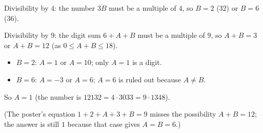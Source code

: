 Divisibility by $4$: the number $\overline{3B}$ must be a multiple of $4$, so $B=2$ ($32$) or $B=6$ ($36$).

Divisibility by $9$: the digit sum $6+A+B$ must be a multiple of $9$, so $A+B=3$ or $A+B=12$ (as $0\le A+B\le18$).
\begin{itemize}
\item $B=2$: $A=1$ or $A=10$; only $A=1$ is a digit.
\item $B=6$: $A=-3$ or $A=6$; $A=6$ is ruled out because $A\ne B$.
\end{itemize}
So $A=\boxed{1}$ (the number is $12132=4\cdot3033=9\cdot1348$).

(The poster's equation $1+2+A+3+B=9$ misses the possibility $A+B=12$; the answer is still $1$ because that case gives $A=B=6$.)
